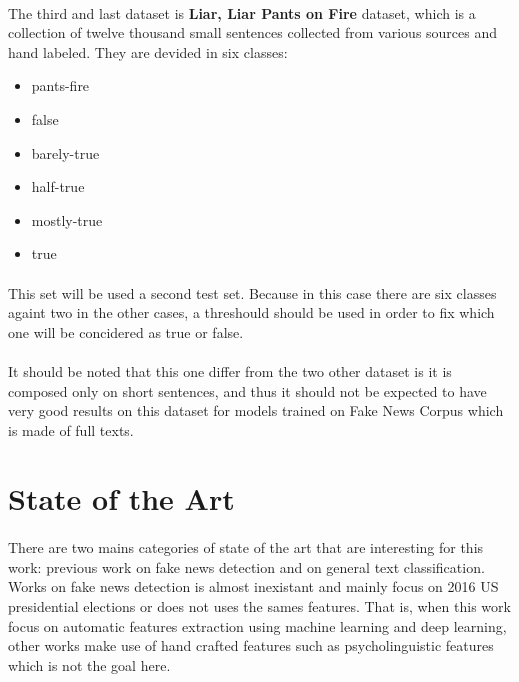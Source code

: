\paragraph{}
The third and last dataset is \textbf{Liar, Liar Pants on Fire} dataset\cite{Wang2017}, which is a collection of twelve thousand small sentences collected from various sources and hand labeled. They are devided in six classes:
\begin{itemize}
	\item pants-fire
	\item false
	\item barely-true
	\item half-true
	\item mostly-true
	\item true
\end{itemize} 
\paragraph{}
This set will be used a second test set. Because in this case there are six classes againt two in the other cases, a threshould should be used in order to fix which one will be concidered as true or false. 
\paragraph{}
It should be noted that this one differ from the two other dataset is it is composed only on short sentences, and thus it should not be expected to have very good results on this dataset for models trained on Fake News Corpus which is made of full texts. 

\section{State of the Art}
\paragraph{} There are two mains categories of state of the art that are interesting for this work: previous work on fake news detection and on general text classification. Works on fake news detection is almost inexistant and mainly focus on 2016 US presidential elections or does not uses the sames features. That is, when this work focus on automatic features extraction using machine learning and deep learning, other works make use of hand crafted features\cite{Reis2019,Perez-Rosas2017} such as psycholinguistic features\cite{Pennebaker2001} which is not the goal here. 

